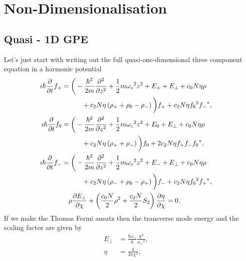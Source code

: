 
\chapter{Non-Dimensionalisation}


\section{Quasi - 1D GPE}

Let's just start with writing out the full quasi-one-dimensional three component equation in a harmonic potential
\begin{subequations}
    \begin{align}
        \imath\hbar\frac{\partial}{\partial t} f_{+} &= \bigg(-\frac{\hbar^2}{2m}\frac{\partial^2}{\partial z^2} + \frac{1}{2}m{\omega_z}^2z^2+ E_+ + E_\perp + c_0 N\eta\rho \notag \\
        & \quad\quad\quad+ c_2 N\eta\left( \rho_+ + \rho_0 - \rho_- \right) \bigg)f_+ + c_2 N\eta{f_0}^2{f_-}^*,\label{eq:fplus}\\
        \imath\hbar\frac{\partial}{\partial t} f_{0} &= \bigg(-\frac{\hbar^2}{2m}\frac{\partial^2}{\partial z^2} + \frac{1}{2}m{\omega_z}^2z^2 + E_0 + E_\perp + c_0 N\eta\rho \notag \\
        & \quad\quad\quad+ c_2 N\eta\left( \rho_+ + \rho_- \right) \bigg)f_0 + 2c_2 N\eta{f_+}{f_-}{f_0}^*,\\
        \imath\hbar\frac{\partial}{\partial t} f_{-} &= \bigg(-\frac{\hbar^2}{2m}\frac{\partial^2}{\partial z^2} + \frac{1}{2}m{\omega_z}^2z^2 + E_- + E_\perp + c_0 N\eta\rho \notag \\
        & \quad\quad\quad+ c_2 N\eta\left( \rho_- + \rho_0 - \rho_+ \right) \bigg)f_- + c_2 N\eta{f_0}^2{f_+}^*,\\
        & \quad \rho\frac{\partial E_\perp}{\partial\chi} + \left(\frac{c_0 N}{2}\rho^2 + \frac{c_2 N}{2}S_2\right)\frac{\partial\eta}{\partial\chi} = 0. \label{rhoEqn}
    \end{align}
\end{subequations}
If we make the Thomas Fermi ansatz then the transverse mode energy and the scaling factor are given by
\begin{align}
    E_\perp &= \frac{\hbar\omega_\perp}{6}\frac{\chi^2}{{a_\perp}^2},\label{Eperp}\\
    \eta &= \frac{4}{3\pi\chi^2}, \label{eta}
\end{align}

